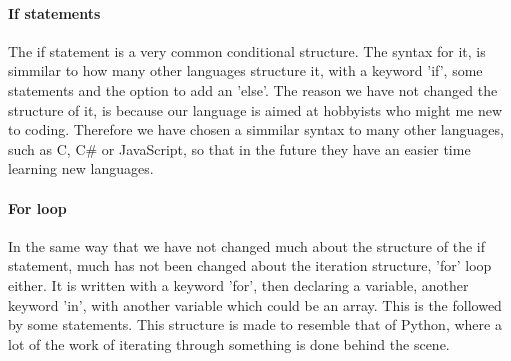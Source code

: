 \paragraph*{If statements}
The if statement is a very common conditional structure. The syntax for it, is simmilar to how many other languages structure it, with a keyword 'if', some statements and the option to add an 'else'. The reason we have not changed the structure of it, is because our language is aimed at hobbyists who might me new to coding. Therefore we have chosen a simmilar syntax to many other languages, such as C, C\# or JavaScript, so that in the future they have an easier time learning new languages.





\paragraph*{For loop}
In the same way that we have not changed much about the structure of the if statement, much has not been changed about the iteration structure, 'for' loop either. It is written with a keyword 'for', then declaring a variable, another keyword 'in', with another variable which could be an array. This is the followed by some statements.
This structure is made to resemble that of Python, where a lot of the work of iterating through something is done behind the scene.

